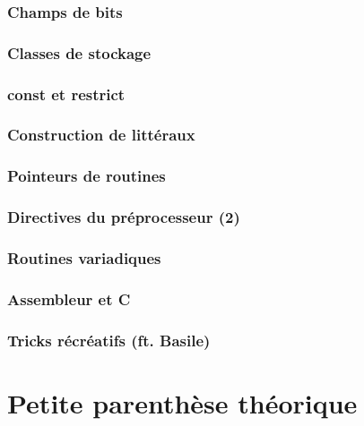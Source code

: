 \documentclass{minitelreport}
\begin{document}
\begin{refsection}
		\section{Champs de bits}
			\label{sec:champs_de_bits}
			
		\section{Classes de stockage}
			\label{sec:classes_de_stockage}
			
		\section{const et restrict}
			\label{sec:const_et_restrict}
			
		\section{Construction de littéraux}
			\label{sec:construction_de_litt_raux}
			
		\section{Pointeurs de routines}
			\label{sec:pointeurs_de_routines}
			
		\section{Directives du préprocesseur (2)}
			\label{sec:directives_de_pr_processeurs_2_}
			
		\section{Routines variadiques}
			\label{sec:routines_variadiques}
			
		\section{Assembleur et C}
			\label{sec:assembleur_et_c}
			
		\section{Tricks récréatifs (ft. Basile)}
			\label{sec:tricks_r_cr_atifs_ft_basile_}
			
\part{Petite parenthèse théorique}
\label{part:petite_parenthèse_théorique}

\end{refsection}
\end{document}
